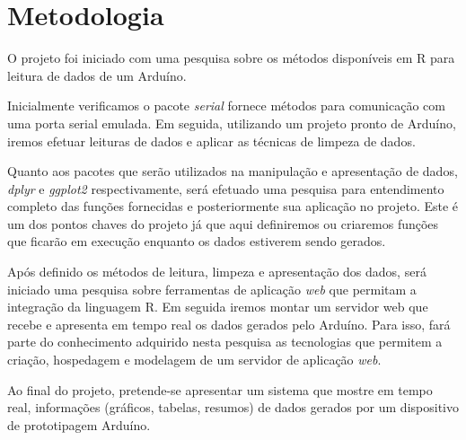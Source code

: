 
\section[Metodologia]{Metodologia}

O projeto foi iniciado com uma pesquisa sobre os métodos disponíveis em R para 
leitura de dados de um Arduíno. 

Inicialmente verificamos o pacote 
\emph{serial} \cite{Seilmayer2017} fornece métodos para comunicação com uma porta serial emulada. Em seguida, 
utilizando um projeto pronto de Arduíno, iremos efetuar leituras de dados e 
aplicar as técnicas de limpeza de dados. 

Quanto aos pacotes que serão utilizados na manipulação e apresentação de dados, 
\emph{dplyr}\cite{Wickham2018} e \emph{ggplot2}\cite{Wickham2009} respectivamente, será efetuado uma pesquisa para 
entendimento completo das funções fornecidas e posteriormente sua aplicação no 
projeto. Este é um dos pontos chaves do projeto já que aqui definiremos ou 
criaremos funções que ficarão em execução enquanto os dados estiverem sendo 
gerados.

Após definido os métodos de leitura, limpeza e apresentação dos dados, será 
iniciado uma pesquisa sobre ferramentas de aplicação \emph{web} que permitam a 
integração da linguagem R. Em seguida iremos montar um servidor web que recebe e 
apresenta em tempo real os dados gerados pelo Arduíno. Para isso, fará parte do 
conhecimento adquirido nesta pesquisa as tecnologias que permitem a criação, 
hospedagem e modelagem de um servidor de aplicação \emph{web}.

Ao final do projeto, pretende-se apresentar um sistema que mostre em tempo real, 
informações (gráficos, tabelas, resumos) de dados gerados por um dispositivo de 
prototipagem Arduíno.

